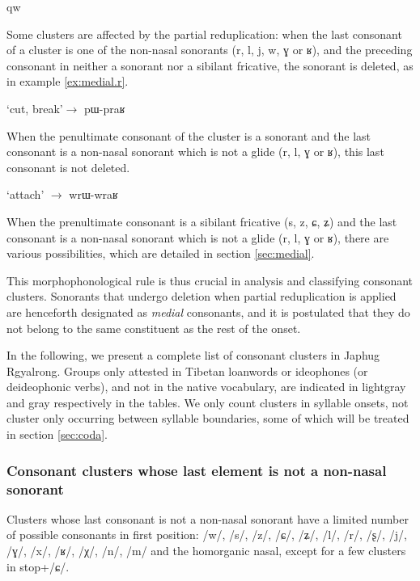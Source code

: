 qw\documentclass[oldfontcommands,oneside,a4paper,11pt]{article}
\newcommand{\ipa}[1]{{\phon #1}} %
\begin{document}
Some clusters are affected by the partial reduplication:   when the last consonant  of a cluster is one of the non-nasal sonorants (\ipa{r}, \ipa{l}, \ipa{j}, \ipa{w}, \ipa{ɣ} or \ipa{ʁ}), and the preceding consonant in neither a sonorant nor a sibilant fricative, the sonorant is deleted, as in example \ref{ex:medial.r}. 
 
 \begin{exe}
\ex \label{ex:medial.r}
\glt \ipa{praʁ} `cut, break'$\rightarrow$ \ipa{pɯ-praʁ}
\end{exe}

When the penultimate consonant of the cluster is a sonorant   and the last consonant is a non-nasal sonorant which is not a glide (\ipa{r}, \ipa{l}, \ipa{ɣ} or \ipa{ʁ}), this last consonant  is not deleted. 

 \begin{exe}
\ex  \label{ex:initial.r}
\glt \ipa{wraʁ} `attach' $\rightarrow$ \ipa{wrɯ-wraʁ}
\end{exe}
  
When the prenultimate consonant is a sibilant fricative   (\ipa{s}, \ipa{z}, \ipa{ɕ}, \ipa{ʑ}) and the last consonant is a non-nasal sonorant which is not a glide (\ipa{r}, \ipa{l}, \ipa{ɣ} or \ipa{ʁ}), there are various possibilities, which are detailed in section \ref{sec:medial}.

This morphophonological rule is thus crucial in analysis and classifying consonant clusters. Sonorants that undergo deletion when partial reduplication is applied are henceforth designated as \textit{medial} consonants, and it is postulated that they do not belong to the same constituent as the rest of the onset.

In the following, we present a complete list of consonant clusters in Japhug Rgyalrong. Groups only attested in Tibetan loanwords or ideophones (or deideophonic verbs), and not in the native vocabulary, are indicated in lightgray and gray respectively in the tables. We only count clusters in syllable onsets, not cluster only occurring between syllable boundaries, some of which will be treated in section \ref{sec:coda}.
  
  
  \subsubsection{Consonant clusters whose last element is not a non-nasal sonorant}  
Clusters whose last consonant is not a non-nasal sonorant have a limited number of possible consonants in first position: /w/, /s/, /z/, /ɕ/, /ʑ/, /l/, /r/, /ʂ/, /j/, /ɣ/, /x/, /ʁ/, /χ/, /n/, /m/ and the homorganic nasal, except for a few clusters in stop+/ɕ/.
\end{document}
